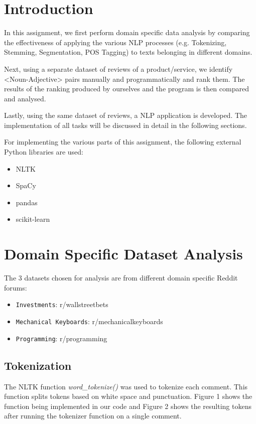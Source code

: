 \documentclass[sigconf,nonacm=true]{acmart}
\begin{document}
\section{Introduction}
In this assignment, we first perform domain specific data analysis by comparing the effectiveness of applying the various NLP processes (e.g. Tokenizing, Stemming, Segmentation, POS Tagging) to texts belonging in different domains. 

Next, using a separate dataset of reviews of a product/service, we identify <Noun-Adjective> pairs manually and programmatically and rank them. The results of the ranking produced by ourselves and the program is then compared and analysed. 

Lastly, using the same dataset of reviews, a NLP application is developed. The implementation of all tasks will be discussed in detail in the following sections.

For implementing the various parts of this assignment, the following external Python libraries are used:
\begin{itemize}
	\item NLTK
	\item SpaCy
	\item pandas
	\item scikit-learn
\end{itemize}

\section{Domain Specific Dataset Analysis}
The 3 datasets chosen for analysis are from different domain specific Reddit forums:
\begin{itemize}
	\item {\verb|Investments|}: r/wallstreetbets
	\item {\verb|Mechanical Keyboards|}: r/mechanicalkeyboards
	\item {\verb|Programming|}: r/programming
\end{itemize}

\subsection{Tokenization} 
The NLTK function \textit{word\_tokenize()} was used to tokenize each comment. This function splits tokens based on white space and punctuation. Figure 1 shows the function being implemented in our code and Figure 2 shows the resulting tokens after running the tokenizer function on a single comment. \bigskip
\end{document}
